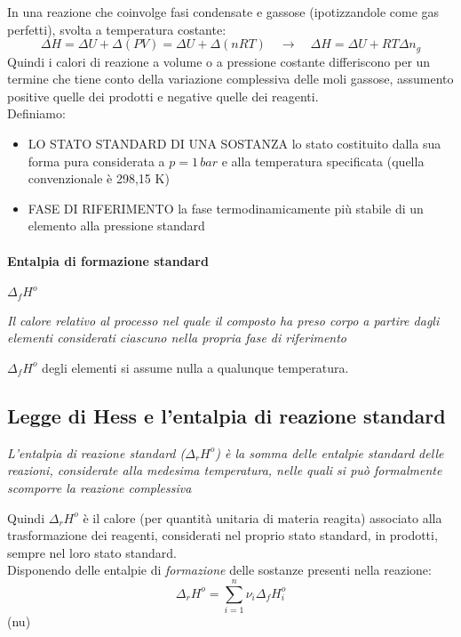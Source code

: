 \documentclass{article}
\newcommand{\so}{\quad \rightarrow \quad}
\newcommand{\ce}[1]{\begin{center}\textit{#1}\end{center}}
\begin{document}
In una reazione che coinvolge fasi condensate e gassose (ipotizzandole come gas perfetti), svolta a temperatura costante:
\begin{equation*}
    \Delta H=\Delta U + \Delta(PV)=\Delta U + \Delta(nRT) \so \Delta H=\Delta U + RT\Delta n_g
\end{equation*}
Quindi i calori di reazione a volume o a pressione costante differiscono per un termine che tiene conto della variazione complessiva delle moli gassose, assumento positive quelle dei prodotti e negative quelle dei reagenti.
\\ Definiamo:
\begin{itemize}
    \item LO STATO STANDARD DI UNA SOSTANZA lo stato costituito dalla sua forma pura considerata a $p=1\,bar$ e alla temperatura specificata (quella convenzionale è 298,15 K)
    \item FASE DI RIFERIMENTO la fase termodinamicamente più stabile di un elemento alla pressione standard
\end{itemize}

\paragraph{Entalpia di formazione standard} $\Delta_fH^o$
\ce{Il calore relativo al processo nel quale il composto ha preso corpo a partire dagli elementi considerati ciascuno nella propria fase di riferimento}  $\Delta_fH^o$ degli elementi si assume nulla a qualunque temperatura.

\subsection{Legge di Hess e l'entalpia di reazione standard}

\begin{center}
    \textit{L'entalpia di reazione standard ($\Delta_rH^o$) è la somma delle entalpie standard delle reazioni, considerate alla medesima temperatura, nelle quali si può formalmente scomporre la reazione complessiva}
\end{center}
Quindi $\Delta_rH^o$ è il calore (per quantità unitaria di materia reagita) associato alla trasformazione dei reagenti, considerati nel proprio stato standard, in prodotti, sempre nel loro stato standard. \\
Disponendo delle entalpie di \textit{formazione} delle sostanze presenti nella reazione:
\begin{equation*}
    \Delta_rH^o=\sum_{i=1}^n\nu_i\Delta_fH_i^o
\end{equation*}
(\gls{nu})
\end{document}
